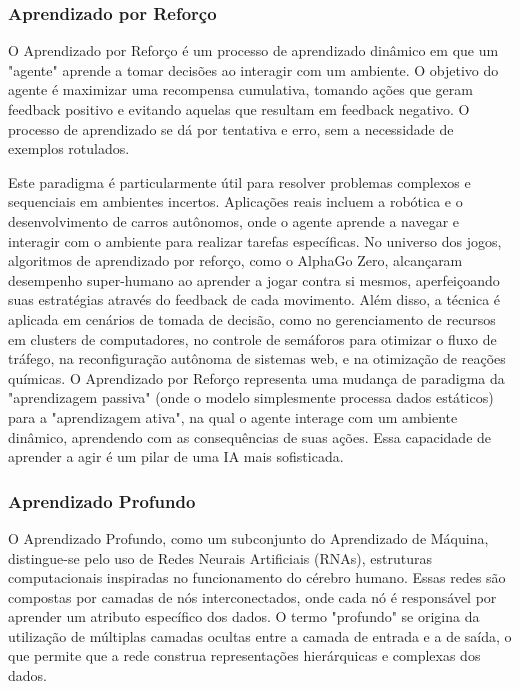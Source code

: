 \subsubsection{Aprendizado por Reforço}

O Aprendizado por Reforço é um processo de aprendizado dinâmico em que um "agente" aprende a tomar decisões ao interagir com um ambiente. O objetivo do agente é maximizar uma recompensa cumulativa, tomando ações que geram feedback positivo e evitando aquelas que resultam em feedback negativo. O processo de aprendizado se dá por tentativa e erro, sem a necessidade de exemplos rotulados.

Este paradigma é particularmente útil para resolver problemas complexos e sequenciais em ambientes incertos. Aplicações reais incluem a robótica e o desenvolvimento de carros autônomos, onde o agente aprende a navegar e interagir com o ambiente para realizar tarefas específicas. No universo dos jogos, algoritmos de aprendizado por reforço, como o AlphaGo Zero, alcançaram desempenho super-humano ao aprender a jogar contra si mesmos, aperfeiçoando suas estratégias através do feedback de cada movimento. Além disso, a técnica é aplicada em cenários de tomada de decisão, como no gerenciamento de recursos em clusters de computadores, no controle de semáforos para otimizar o fluxo de tráfego, na reconfiguração autônoma de sistemas web, e na otimização de reações químicas. O Aprendizado por Reforço representa uma mudança de paradigma da "aprendizagem passiva" (onde o modelo simplesmente processa dados estáticos) para a "aprendizagem ativa", na qual o agente interage com um ambiente dinâmico, aprendendo com as consequências de suas ações. Essa capacidade de aprender a agir é um pilar de uma IA mais sofisticada.

\subsubsection{Aprendizado Profundo}

O Aprendizado Profundo, como um subconjunto do Aprendizado de Máquina, distingue-se pelo uso de Redes Neurais Artificiais (RNAs), estruturas computacionais inspiradas no funcionamento do cérebro humano. Essas redes são compostas por camadas de nós interconectados, onde cada nó é responsável por aprender um atributo específico dos dados. O termo "profundo" se origina da utilização de múltiplas camadas ocultas entre a camada de entrada e a de saída, o que permite que a rede construa representações hierárquicas e complexas dos dados.

